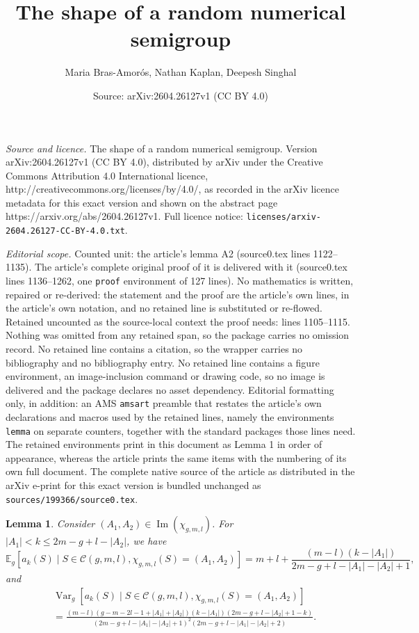\documentclass[10pt,a4paper]{amsart}
\title{The shape of a random numerical semigroup}
\author{Maria Bras-Amor\'os, Nathan Kaplan, Deepesh Singhal}
\date{Source: arXiv:2604.26127v1 (CC BY 4.0)}
\newtheorem{lemma}{Lemma}
\def\E{{\mathbb E}}
\def\Ima{{\operatorname{Im}}}
\def\Var{{\operatorname{Var}}}
\newcommand{\cC}{\mathcal{C}}
\begin{document}
\maketitle

\noindent\emph{Source and licence.} The shape of a random numerical semigroup. Version arXiv:2604.26127v1 (CC BY 4.0), distributed by arXiv under the Creative Commons Attribution 4.0 International licence, http://creativecommons.org/licenses/by/4.0/, as recorded in the arXiv licence metadata for this exact version and shown on the abstract page https://arxiv.org/abs/2604.26127v1. Full licence notice: \texttt{licenses/arxiv-2604.26127-CC-BY-4.0.txt}.\par\smallskip

\noindent\textit{Editorial scope.} Counted unit: the article's lemma A2 (source0.tex lines 1122--1135). The article's complete original proof of it is delivered with it (source0.tex lines 1136--1262, one \texttt{proof} environment of 127 lines). No mathematics is written, repaired or re-derived: the statement and the proof are the article's own lines, in the article's own notation, and no retained line is substituted or re-flowed.  Retained uncounted as the source-local context the proof needs: lines 1105--1115.  Nothing was omitted from any retained span, so the package carries no omission record.  No retained line contains a citation, so the wrapper carries no bibliography and no bibliography entry.  No retained line contains a figure environment, an image-inclusion command or drawing code, so no image is delivered and the package declares no asset dependency.  Editorial formatting only, in addition: an AMS \texttt{amsart} preamble that restates the article's own declarations and macros used by the retained lines, namely the environments \texttt{lemma} on separate counters, together with the standard packages those lines need.  The retained environments print in this document as Lemma 1 in order of appearance, whereas the article prints the same items with the numbering of its own full document.  The complete native source of the article as distributed in the arXiv e-print for this exact version is bundled unchanged as \texttt{sources/199366/source0.tex}.
\begin{lemma}\label{Lem: aks depth 3}
Consider $(A_1,A_2)\in \Ima(\chi_{g,m,l})$. For $|A_1|<k\leq 2m-g+l-|A_2|$, we have
\[
\E_g[a_{k}(S)\mid S\in \cC(g,m,l), \chi_{g,m,l}(S)=(A_1,A_2)] =m+l+\frac{(m-l)(k-|A_1|)}{2m-g+l-|A_1|-|A_2|+1},
\]
and 
\begin{align*}
&\Var_g[a_{k}(S)\mid S\in \cC(g,m,l), \chi_{g,m,l}(S)=(A_1,A_2)] \\
&=\frac{(m-l)(g-m-2l-1+|A_1|+|A_2|) (k-|A_1|) (2m-g+l-|A_2|+1-k)}{(2m-g+l-|A_1|-|A_2|+1)^2 (2m-g+l-|A_1|-|A_2|+2)}.  
\end{align*}
\end{lemma}
\end{document}
